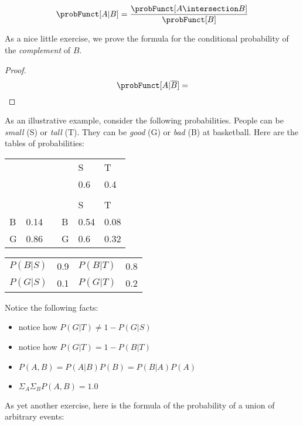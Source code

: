 \begin{definition}
    $$ \probFunct[A | B] = \frac{\probFunct[A \intersection B]}{\probFunct[B]}$$
\end{definition}

As a nice little exercise, we prove the formula for the conditional probability of the \emph{complement} of $B$.

\begin{proof}
    $$ \probFunct[A | \overline{B}] = $$
\end{proof}



As an illustrative example, consider the following probabilities. People can be \emph{small} (S) or \emph{tall} (T). They can be \emph{good} (G) or \emph{bad} (B) at basketball.
Here are the tables of probabilities:

\begin{table}[H]
    \centering
    \begin{tabular}{llllll}
      &      &  &   & S    & T    \\
      &      &  &   & 0.6  & 0.4  \\
      &      &  &   &      &      \\
      &      &  &   & S    & T    \\
    B & 0.14 &  & B & 0.54 & 0.08 \\
    G & 0.86 &  & G & 0.6  & 0.32
    \end{tabular}
\end{table}

\begin{table}[H]
    \centering
    \begin{tabular}{llll}
        $P(B|S)$ & 0.9 & $P(B|T)$ & 0.8 \\
        $P(G|S)$ & 0.1 & $P(G|T)$ & 0.2 
    \end{tabular}
\end{table}

Notice the following facts:
\begin{itemize}
    \item notice how $P(G|T) \neq 1 - P(G|S)$
    \item notice how $P(G|T) = 1 - P(B|T)$
    \item $P(A, B) = P(A|B) P(B) = P(B|A) P(A)$
    \item $ \Sigma_A \Sigma_B P(A, B) = 1.0 $
\end{itemize}

As yet another exercise, here is the formula of the probability of a union of arbitrary events: 

